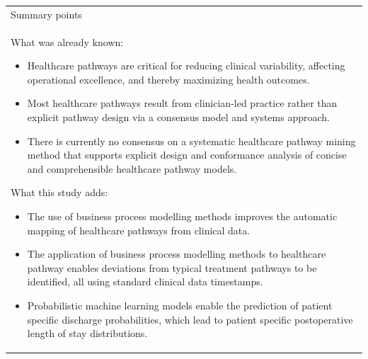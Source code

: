 \begin{table}[h]
\centering
\begin{tabular}{p{11cm}} 
 Summary points\\ 
 What was already known:
 \begin{itemize}
     \item Healthcare pathways are critical for reducing clinical variability, affecting operational excellence, and thereby maximizing health outcomes.
     \item  Most healthcare pathways result from clinician-led practice rather than explicit pathway design via a consensus model and systems approach. 
     \item  There is currently no consensus on a systematic healthcare pathway mining method that supports explicit design and conformance analysis of concise and comprehensible healthcare pathway models.
 \end{itemize}
 What this study adds:
 \begin{itemize}
     \item  The use of business process modelling methods improves the automatic mapping of healthcare pathways from clinical data.
     \item The application of business process modelling methods to
       healthcare pathway enables deviations from typical treatment
       pathways to be identified, all using standard clinical data
       timestamps.
     \item Probabilistic machine learning models enable the prediction
       of patient specific discharge probabilities, which lead to
       patient specific postoperative
       length of stay distributions.
 \end{itemize}
\end{tabular}
\end{table}
